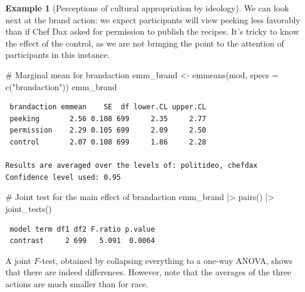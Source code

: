 \documentclass[
  11pt,
  letterpaper,
]{scrbook}
\newenvironment{Shaded}{\begin{snugshade}}{\end{snugshade}}
\newcommand{\AttributeTok}[1]{\textcolor[rgb]{0.40,0.45,0.13}{#1}}
\newcommand{\CommentTok}[1]{\textcolor[rgb]{0.37,0.37,0.37}{#1}}
\newcommand{\FunctionTok}[1]{\textcolor[rgb]{0.28,0.35,0.67}{#1}}
\newcommand{\NormalTok}[1]{\textcolor[rgb]{0.00,0.23,0.31}{#1}}
\newcommand{\OtherTok}[1]{\textcolor[rgb]{0.00,0.23,0.31}{#1}}
\newcommand{\SpecialCharTok}[1]{\textcolor[rgb]{0.37,0.37,0.37}{#1}}
\newcommand{\StringTok}[1]{\textcolor[rgb]{0.13,0.47,0.30}{#1}}
\theoremstyle{definition}
\theoremstyle{definition}
\newtheorem{example}{Example}[chapter]
\theoremstyle{remark}
\begin{document}
\begin{example}[Perceptions of cultural appropriation by
ideology]
We can look next at the brand action: we expect participants will view
peeking less favorably than if Chef Dax asked for permission to publish
the recipes. It's tricky to know the effect of the control, as we are
not bringing the point to the attention of participants in this
instance.

\begin{Shaded}
\begin{Highlighting}[]
\CommentTok{\# Marginal mean for brandaction}
\NormalTok{emm\_brand }\OtherTok{\textless{}{-}} \FunctionTok{emmeans}\NormalTok{(mod, }\AttributeTok{specs =} \FunctionTok{c}\NormalTok{(}\StringTok{"brandaction"}\NormalTok{)) }
\NormalTok{emm\_brand}
\end{Highlighting}
\end{Shaded}

\begin{verbatim}
 brandaction emmean    SE  df lower.CL upper.CL
 peeking       2.56 0.108 699     2.35     2.77
 permission    2.29 0.105 699     2.09     2.50
 control       2.07 0.108 699     1.86     2.28

Results are averaged over the levels of: politideo, chefdax 
Confidence level used: 0.95 
\end{verbatim}

\begin{Shaded}
\begin{Highlighting}[]
\CommentTok{\# Joint test for the main effect of brandaction}
\NormalTok{emm\_brand }\SpecialCharTok{|\textgreater{}} \FunctionTok{pairs}\NormalTok{() }\SpecialCharTok{|\textgreater{}} \FunctionTok{joint\_tests}\NormalTok{()}
\end{Highlighting}
\end{Shaded}

\begin{verbatim}
 model term df1 df2 F.ratio p.value
 contrast     2 699   5.091  0.0064
\end{verbatim}

A joint \(F\)-test, obtained by collapsing everything to a one-way
ANOVA, shows that there are indeed differences. However, note that the
averages of the three actions are much smaller than for race.

\end{example}
\end{document}
